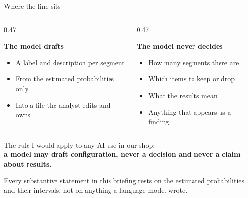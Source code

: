 \documentclass[
  ignorenonframetext,
  aspectratio=169,
]{beamer}
\newcommand{\kicker}[1]{\par\noindent{\footnotesize\color{vteal}\textbf{\MakeUppercase{#1}}}\par\vspace{0.4em}}
\begin{document}
\begin{frame}[shrink]{Where the line sits}
\label{where-the-line-sits}
\kicker{a deliberate boundary}

\small

\begin{columns}[T]
\begin{column}{0.47\textwidth}
\colorbox{vgreen!18}{\parbox{0.95\textwidth}{\small
\textbf{The model drafts}
\begin{itemize}\itemsep1pt
  \item A label and description per segment
  \item From the estimated probabilities only
  \item Into a file the analyst edits and owns
\end{itemize}}}
\end{column}
\begin{column}{0.47\textwidth}
\colorbox{vpurple!12}{\parbox{0.95\textwidth}{\small
\textbf{The model never decides}
\begin{itemize}\itemsep1pt
  \item How many segments there are
  \item Which items to keep or drop
  \item What the results mean
  \item Anything that appears as a finding
\end{itemize}}}
\end{column}
\end{columns}

\vspace{0.8em}

\begin{center}
\colorbox{vteal!15}{\parbox{0.93\textwidth}{\centering
The rule I would apply to any AI use in our shop: \\
\textbf{a model may draft configuration, never a decision and never a claim about results.}}}
\end{center}

\vspace{0.4em}

\footnotesize
\begin{center}
Every substantive statement in this briefing rests on the estimated probabilities and their intervals, not on anything a language model wrote.
\end{center}

\end{frame}
\end{document}
